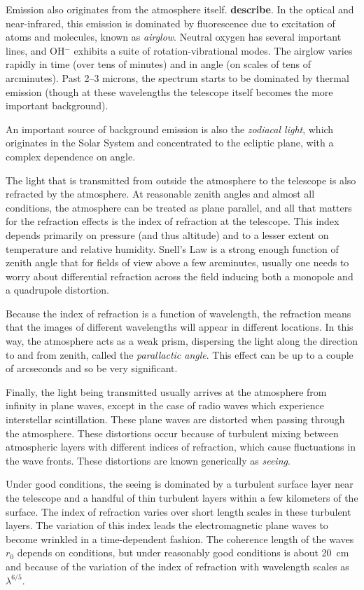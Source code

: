 Emission also originates from the atmosphere itself. {\bf
describe}. In the optical and near-infrared, this emission is
dominated by fluorescence due to excitation of atoms and molecules,
known as {\it airglow}. Neutral oxygen has several important lines,
and OH$^{-}$ exhibits a suite of rotation-vibrational modes. The
airglow varies rapidly in time (over tens of minutes) and in angle (on
scales of tens of arcminutes). Past 2--3 microns, the spectrum starts
to be dominated by thermal emission (though at these wavelengths the
telescope itself becomes the more important background).

An important source of background emission is also the {\it zodiacal
light}, which originates in the Solar System and concentrated to the
ecliptic plane, with a complex dependence on angle.

The light that is transmitted from outside the atmosphere to the
telescope is also refracted by the atmosphere. At reasonable zenith
angles and almost all conditions, the atmosphere can be treated as
plane parallel, and all that matters for the refraction effects is the
index of refraction at the telescope. This index depends primarily on
pressure (and thus altitude) and to a lesser extent on temperature and
relative humidity. Snell's Law is a strong enough function of zenith
angle that for fields of view above a few arcminutes, usually one
needs to worry about differential refraction across the field inducing
both a monopole and a quadrupole distortion.

Because the index of refraction is a function of wavelength, the
refraction means that the images of different wavelengths will appear
in different locations. In this way, the atmosphere acts as a weak
prism, dispersing the light along the direction to and from zenith,
called the {\it parallactic angle}. This effect can be up to a couple
of arcseconds and so be very significant.

Finally, the light being transmitted usually arrives at the atmosphere
from infinity in plane waves, except in the case of radio waves which
experience interstellar scintillation. These plane waves are distorted
when passing through the atmosphere. These distortions occur because
of turbulent mixing between atmospheric layers with different indices
of refraction, which cause fluctuations in the wave fronts. These
distortions are known generically as {\it seeing}.

Under good conditions, the seeing is dominated by a turbulent surface
layer near the telescope and a handful of thin turbulent layers within
a few kilometers of the surface. The index of refraction varies over
short length scales in these turbulent layers. The variation of this
index leads the electromagnetic plane waves to become wrinkled in a
time-dependent fashion. The coherence length of the waves $r_0$
depends on conditions, but under reasonably good conditions is about
20~cm and because of the variation of the index of refraction with
wavelength scales as $\lambda^{6/5}$.

